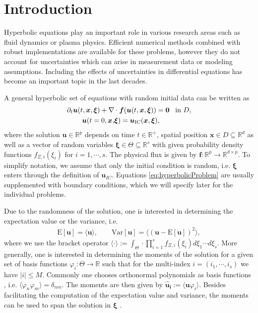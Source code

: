 \section{Introduction}
Hyperbolic equations play an important role in various research areas such as fluid dynamics or plasma physics. Efficient numerical methods combined with robust implementations are available for these problems, however they do not account for uncertainties which can arise in measurement data or modeling assumptions. Including the effects of uncertainties in differential equations has become an important topic in the last decades. %

A general hyperbolic set of equations with random initial data can be written as
\begin{subequations}\label{eq:hyperbolicProblem}
\begin{align}
\partial_t \bm{u}(t,\bm{x},\bm{\xi}) + \nabla&\cdot\bm{f}(\bm{u}(t,\bm{x},\bm{\xi})) = \bm{0} \enskip \text{ in } D, \\ \label{eq:ic}
\bm{u}(t=0,\bm{x},&\bm{\xi}) = \bm{u}_{\text{IC}}(\bm{x},\bm{\xi}),
\end{align}
\end{subequations}
where the solution $\bm u\in\mathbb{R}^p$ depends on time $t\in\mathbb{R}^+$, spatial position $\bm{x}\in D\subseteq \mathbb{R}^d$ as well as a vector of random variables $\bm{\xi}\in\Theta\subseteq\mathbb{R}^s$ with given probability density functions $f_{\Xi,i}(\xi_i)$ for $i = 1,\cdots,s$. The physical flux is given by $\bm{f}:\mathbb{R}^p\to\mathbb{R}^{d\times p}$. To simplify notation, we assume that only the initial condition is random, i.e. $\bm{\xi}$ enters through the definition of $\bm{u}_{IC}$. Equations \eqref{eq:hyperbolicProblem} are usually supplemented with boundary conditions, which we will specify later for the individual problems.

Due to the randomness of the solution, one is interested in determining the expectation value or the variance, i.e.
\begin{align*}
\text{E}[\bm{u}] = \langle \bm{u} \rangle,\qquad \text{Var}[\bm{u}] = \langle \left( \bm{u}-\text{E}[\bm{u}]\right)^2\rangle,
\end{align*}
where we use the bracket operator $\langle \cdot \rangle := \int_{\Theta} \cdot \prod_{i=1}^s f_{\Xi,i}(\xi_i)d\xi_1 \cdots d\xi_s$. More generally, one is interested in determining the moments of the solution for a given set of basis functions $\varphi_{i}:\Theta\to\mathbb{R}$ such that for the multi-index $i = (i_1,\cdots,i_s)$ we have $|i| \leq M$. Commonly one chooses orthonormal polynomials as basis functions \cite{xiu2002wiener}, i.e. $\langle \varphi_n \varphi_m \rangle = \delta_{nm}$.  The moments are then given by $\bm{\hat u_i} := \langle \bm{u}\varphi_i \rangle$. Besides facilitating the computation of the expectation value and variance, the moments can be used to span the solution in $\bm\xi$ \cite{wiener1938homogeneous}. \\

